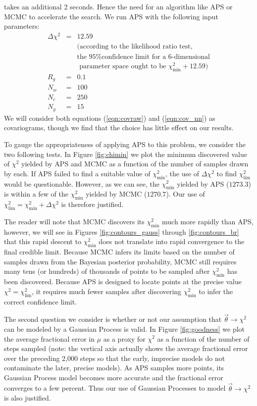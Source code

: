 \documentclass[useAMS,usenatbib]{aastex}
\begin{document}
\cite{wmap7likelihood} takes an additional 2 seconds.  Hence the need
for an algorithm like APS or MCMC to accelerate the search.
We run APS with the following input parameters:
\begin{eqnarray}
\Delta\chi^2&=&12.59 \nonumber\\
&&\text{(according to the likelihood ratio test,}\nonumber\\
&&\text{the
95\% confidence limit for a 6-dimensional}\nonumber\\
&&\text{ parameter space
ought to be }\chi^2_\text{min}+12.59\text{)}\nonumber\\
R_g&=&0.1\nonumber\\
N_w&=&100\nonumber\\
N_c&=&250\nonumber\\
N_g&=&15\nonumber
\end{eqnarray}
We will consider both equations (\ref{eqn:covraw}) and (\ref{eqn:cov_nn})
as covariograms, though we find that the choice has little effect on our
results.

To gauge the appropriateness of applying APS to this problem, we consider
the two following tests.  In Figure \ref{fig:chimin} we plot the minimum discovered value
of $\chi^2$ yielded by APS and MCMC as a function of the number of samples drawn
by each.  If APS failed to find a suitable value of $\chi^2_\text{min}$, the use of
$\Delta\chi^2$  to find $\chi^2_\text{lim}$ would be questionable.  However, as we can see,
the $\chi^2_\text{min}$ yielded by APS ($1273.3$) 
is within a few of the $\chi^2_\text{min}$ yielded
by MCMC ($1270.7$).  Our use of $\chi^2_\text{lim}=\chi^2_\text{min}+\Delta\chi^2$ is therefore
justified.

The reader will note that
MCMC discovers its $\chi^2_\text{min}$ much more rapidly than APS, however, 
we will see
in Figures \ref{fig:contours_gauss} through \ref{fig:contours_br} that this rapid
descent to $\chi^2_\text{min}$ does not translate into rapid convergence to
the final credible limit.  Because MCMC infers its limits based on the number
of samples drawn from the Bayesian posterior probability, MCMC still requires
many tens (or hundreds) of thousands of points to be sampled after $\chi^2_\text{min}$
has been discovered.  Because APS is designed to locate points at the precise value
$\chi^2=\chi^2_\text{lim}$, it requires much fewer samples after discovering 
$\chi^2_\text{min}$ to infer the correct confidence limit.

The second question we consider is whether or not our assumption that
$\vec{\theta}\rightarrow\chi^2$ can be modeled by a Gaussian Process is 
valid.  In Figure
\ref{fig:goodness} we plot the average fractional error in $\mu$ as a proxy for $\chi^2$ as a
function of the number of steps sampled (note: the vertical axis actually shows the average
fractional error over the preceding 2,000 steps so that the early, imprecise models do not
contaminate the later, precise models).  As APS samples more points, its Gaussian Process
model becomes more accurate and the fractional error converges to a few percent.  Thus our
use of Gaussian Processes to model $\vec{\theta}\rightarrow\chi^2$ is also justified.
\end{document}
